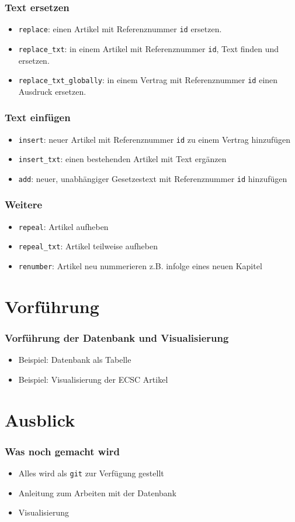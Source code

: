 \documentclass[xcolor=dvipsnames]{beamer} %
\begin{document}
\begin{frame}
  \frametitle{Text ersetzen}
  \begin{itemize}
  \item \texttt{replace}: einen Artikel mit Referenznummer \texttt{id}
    ersetzen.
  \item \texttt{replace\_txt}: in einem Artikel mit Referenznummer \texttt{id},
   Text finden und ersetzen.
 \item \texttt{replace\_txt\_globally}: in einem Vertrag mit Referenznummer
   \texttt{id} einen Ausdruck ersetzen.
  \end{itemize}
\end{frame}

\begin{frame}
  \frametitle{Text einfügen}
  \begin{itemize}
  \item \texttt{insert}: neuer Artikel mit Referenznummer \texttt{id} zu einem
    Vertrag hinzufügen
  \item \texttt{insert\_txt}: einen bestehenden Artikel mit Text ergänzen
  \item \texttt{add}: neuer, unabhängiger Gesetzestext mit Referenznummer
    \texttt{id} hinzufügen
  \end{itemize}
\end{frame}

\begin{frame}
  \frametitle{Weitere}
  \begin{itemize}
  \item \texttt{repeal}: Artikel aufheben
  \item \texttt{repeal\_txt}: Artikel teilweise aufheben
  \item \texttt{renumber}: Artikel neu nummerieren z.B. infolge eines neuen
    Kapitel      
  \end{itemize}
\end{frame}

\section{Vorführung}
\begin{frame}
  \frametitle{Vorführung der Datenbank und Visualisierung}
  \begin{itemize}
  \item Beispiel: Datenbank als Tabelle
  \item Beispiel: Visualisierung der ECSC Artikel 
  \end{itemize}
\end{frame}

\section{Ausblick}
\begin{frame}
  \frametitle{Was noch gemacht wird}
  \begin{itemize}
  \item Alles wird als \texttt{git} zur Verfügung gestellt
  \item Anleitung zum Arbeiten mit der Datenbank
  \item Visualisierung
  \end{itemize}
\end{frame}
\end{document}
